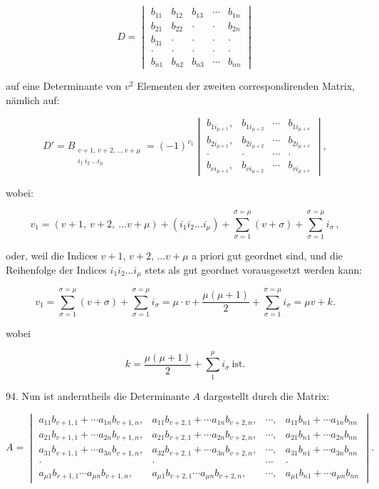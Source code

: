 \documentclass[11pt]{article}
\providecommand{\weberpage}[1]{}
\begin{document}
\[
D =
\begin{vmatrix}
b_{11} & b_{12} & b_{13} & \cdots & b_{1n} \\
b_{21} & b_{22} & \cdot & \cdot & b_{2n} \\
b_{31} & \cdot & \cdot & \cdot & \cdot \\
\cdot & \cdot & \cdot & \cdot & \cdot \\
b_{n1} & b_{n2} & b_{n3} & \cdots & b_{nn}
\end{vmatrix}
\]

auf eine Determinante von $v^2$ Elementen der zweiten correspondirenden Matrix, n\"amlich auf:

\[
D' = B_{\substack{v+1,\,v+2,\,\ldots\,v+\mu\\i_1\ i_2\ \ldots i_\mu}} = (-1)^{v_1}
\begin{vmatrix}
b_{1i_{\mu+1}}, & b_{1i_{\mu+2}} & \cdots & b_{1i_{\mu+v}} \\
b_{2i_{\mu+1}}, & b_{2i_{\mu+2}} & \cdots & b_{2i_{\mu+v}} \\
\cdot & \cdot & \cdots & \cdot \\
b_{vi_{\mu+1}}, & b_{vi_{\mu+2}} & \cdots & b_{vi_{\mu+v}}
\end{vmatrix},
\]

wobei:


\weberpage{98}
\[
v_1 = (v+1,\ v+2,\ \ldots v+\mu) + (i_1 i_2 \ldots i_\mu) + \sum_{\sigma=1}^{\sigma=\mu}(v+\sigma) + \sum_{\sigma=1}^{\sigma=\mu} i_\sigma\,,
\]

oder, weil die Indices $v+1$, $v+2$, $\ldots v+\mu$ a priori gut geordnet sind, und die Reihenfolge der Indices $i_1 i_2 \ldots i_\mu$ stets als gut geordnet vorausgesetzt werden kann:

\[
v_1 = \sum_{\sigma=1}^{\sigma=\mu}(v+\sigma) + \sum_{\sigma=1}^{\sigma=\mu} i_\sigma = \mu\cdot v + \frac{\mu(\mu+1)}{2} + \sum_{\sigma=1}^{\sigma=\mu} i_\sigma = \mu v + k.
\]

wobei

\[
k = \frac{\mu(\mu+1)}{2} + \sum_{1}^{\mu} i_\sigma\ \text{ist.}
\]

94. Nun ist anderntheils die Determinante $A$ dargestellt durch die Matrix:

\[
A =
\begin{vmatrix}
a_{11}b_{v+1,1}+\cdots a_{1n}b_{v+1,n}, & a_{11}b_{v+2,1}+\cdots a_{1n}b_{v+2,n}, & \cdots, & a_{11}b_{n1}+\cdots a_{1n}b_{nn} \\
a_{21}b_{v+1,1}+\cdots a_{2n}b_{v+1,n}, & a_{21}b_{v+2,1}+\cdots a_{2n}b_{v+2,n}, & \cdots, & a_{21}b_{n1}+\cdots a_{2n}b_{nn} \\
a_{31}b_{v+1,1}+\cdots a_{3n}b_{v+1,n}, & a_{32}b_{v+2,1}+\cdots a_{3n}b_{v+2,n}, & \cdots, & a_{31}b_{n1}+\cdots a_{3n}b_{nn} \\%
\cdot & \cdot & \cdots & \cdot \\
a_{\mu 1}b_{v+1,1}\cdots a_{\mu n}b_{v+1,n}, & a_{\mu 1}b_{v+2,1}\cdots a_{\mu n}b_{v+2,n}, & \cdots, & a_{\mu 1}b_{n1}+\cdots a_{\mu n}b_{nn}
\end{vmatrix}.
\]
\end{document}
